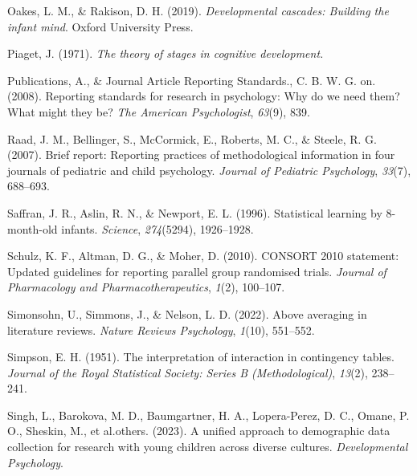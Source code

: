 \documentclass[
  man]{apa6}
\newlength{\cslhangindent}
\newlength{\cslentryspacingunit} %
\newenvironment{CSLReferences}[2] %
 {%
  \setlength{\parindent}{0pt}
  \ifodd #1
  \let\oldpar\par
  \def\par{\hangindent=\cslhangindent\oldpar}
  \fi
  \setlength{\parskip}{#2\cslentryspacingunit}
 }%
 {}
\begin{document}
\begin{CSLReferences}{1}{0}
\leavevmode{}%
Oakes, L. M., \& Rakison, D. H. (2019). \emph{Developmental cascades: Building the infant mind}. Oxford University Press.

\leavevmode{}%
Piaget, J. (1971). \emph{The theory of stages in cognitive development.}

\leavevmode{}%
Publications, A., \& Journal Article Reporting Standards., C. B. W. G. on. (2008). Reporting standards for research in psychology: Why do we need them? What might they be? \emph{The American Psychologist}, \emph{63}(9), 839.

\leavevmode{}%
Raad, J. M., Bellinger, S., McCormick, E., Roberts, M. C., \& Steele, R. G. (2007). Brief report: Reporting practices of methodological information in four journals of pediatric and child psychology. \emph{Journal of Pediatric Psychology}, \emph{33}(7), 688--693.

\leavevmode{}%
Saffran, J. R., Aslin, R. N., \& Newport, E. L. (1996). Statistical learning by 8-month-old infants. \emph{Science}, \emph{274}(5294), 1926--1928.

\leavevmode{}%
Schulz, K. F., Altman, D. G., \& Moher, D. (2010). CONSORT 2010 statement: Updated guidelines for reporting parallel group randomised trials. \emph{Journal of Pharmacology and Pharmacotherapeutics}, \emph{1}(2), 100--107.

\leavevmode{}%
Simonsohn, U., Simmons, J., \& Nelson, L. D. (2022). Above averaging in literature reviews. \emph{Nature Reviews Psychology}, \emph{1}(10), 551--552.

\leavevmode{}%
Simpson, E. H. (1951). The interpretation of interaction in contingency tables. \emph{Journal of the Royal Statistical Society: Series B (Methodological)}, \emph{13}(2), 238--241.

\leavevmode{}%
Singh, L., Barokova, M. D., Baumgartner, H. A., Lopera-Perez, D. C., Omane, P. O., Sheskin, M., et al.others. (2023). A unified approach to demographic data collection for research with young children across diverse cultures. \emph{Developmental Psychology}.


\end{CSLReferences}
\end{document}
